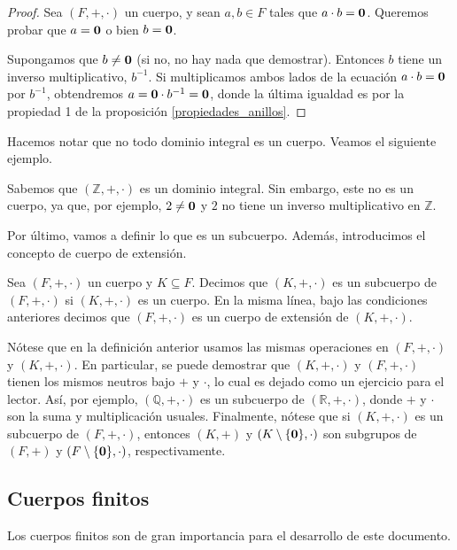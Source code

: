 \begin{proof} 
Sea $(F, +, \cdot)$ un cuerpo, y sean $a, b \in F$ tales que $a \cdot b = \mathbf{0}$. Queremos probar que $a = \mathbf{0}$ o bien $b = \mathbf{0}$.

Supongamos que $b \neq \mathbf{0}$ (si no, no hay nada que demostrar). Entonces $b$ tiene un inverso multiplicativo, $b^{-1}$. Si multiplicamos ambos lados de la ecuación $a \cdot b = \mathbf{0}$ por $b^{-1}$, obtendremos $a = \mathbf{0} \cdot b^{-1} = \mathbf{0}$, donde la última igualdad es por la propiedad 1 de la proposición \ref{propiedades_anillos}.
\end{proof}

Hacemos notar que no todo dominio integral es un cuerpo. Veamos el siguiente ejemplo.

\begin{example}
Sabemos que $(\mathbb{Z}, +, \cdot)$ es un dominio integral. Sin embargo, este no es un cuerpo, ya que, por ejemplo, $2 \neq \mathbf{0}$ y $2$ no tiene un inverso multiplicativo en $\mathbb{Z}$.
\end{example}


Por último, vamos a definir lo que es un subcuerpo. Además, introducimos el concepto de cuerpo de extensión.
\begin{definition}
Sea $(F,+,\cdot)$ un cuerpo y $K\subseteq F$. Decimos que $(K,
+, \cdot)$ es un subcuerpo de $(F,+,\cdot)$ si $(K, +, \cdot)$ es un
cuerpo. En la misma línea, bajo las condiciones anteriores decimos que
$(F,+,\cdot)$ es un cuerpo de extensión de $(K,+,\cdot)$.
\end{definition}

Nótese que en la definición anterior usamos las mismas operaciones en
$(F,+,\cdot)$ y $(K, +, \cdot)$. En particular, se puede demostrar que
$(K, +, \cdot)$ y $(F,+,\cdot)$ tienen los mismos neutros bajo $+$ y
$\cdot$, lo cual es dejado como un ejercicio para el lector. Así, por
ejemplo, $(\mathbb{Q}, +, \cdot)$ es un subcuerpo de $(\mathbb{R},
+, \cdot)$, donde $+$ y $\cdot$ son la suma y multiplicación
usuales. Finalmente, nótese que si $(K, +, \cdot)$ es un subcuerpo de
$(F,+,\cdot)$, entonces $(K, +)$ y $(K \setminus \{\mathbf{0}\}, \cdot)$ son
subgrupos de $(F, +)$ y $(F \setminus \{\mathbf{0}\}, \cdot)$,
respectivamente.



\subsection{Cuerpos finitos}
Los cuerpos finitos son de gran importancia para el desarrollo de este
documento.

